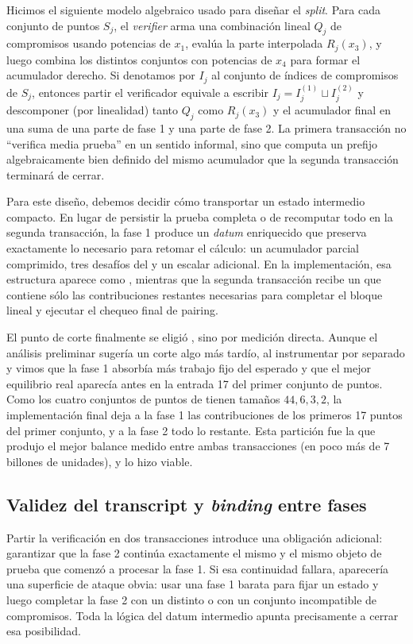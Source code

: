 Hicimos el siguiente modelo algebraico usado para diseñar el \textit{split}. Para cada conjunto de puntos $S_j$, el \textit{verifier} arma una combinación lineal $Q_j$ de compromisos usando potencias de $x_1$, evalúa la parte interpolada $R_j(x_3)$, y luego combina los distintos conjuntos con potencias de $x_4$ para formar el acumulador derecho. Si denotamos por $I_j$ al conjunto de índices de compromisos de $S_j$, entonces partir el verificador equivale a escribir $I_j = I_j^{(1)} \sqcup I_j^{(2)}$ y descomponer (por linealidad) tanto $Q_j$ como $R_j(x_3)$ y el acumulador final en una suma de una parte de fase 1 y una parte de fase 2. La primera transacción no ``verifica media prueba'' en un sentido informal, sino que computa un prefijo algebraicamente bien definido del mismo acumulador que la segunda transacción terminará de cerrar.

Para este diseño, debemos decidir cómo transportar un estado intermedio compacto. En lugar de persistir la prueba completa o de recomputar todo en la segunda transacción, la fase 1 produce un \textit{datum} enriquecido que preserva exactamente lo necesario para retomar el cálculo: un acumulador parcial comprimido, tres desafíos del \transcript y un escalar adicional. En la implementación, esa estructura aparece como \PhaseOneState, mientras que la segunda transacción recibe un \ReducedRedeemer que contiene sólo las contribuciones restantes necesarias para completar el bloque lineal y ejecutar el chequeo final de pairing.

El punto de corte finalmente se eligió , sino por medición directa. Aunque el análisis preliminar sugería un corte algo más tardío, al instrumentar por separado \PhaseOneSetupTx y \PhaseTwoVerifyTx vimos que la fase 1 absorbía más trabajo fijo del esperado y que el mejor equilibrio real aparecía antes en la entrada 17 del primer conjunto de puntos. Como los cuatro conjuntos de puntos de \MidnightSTMCircuit tienen tamaños $44, 6, 3, 2$, la implementación final deja a la fase 1 las contribuciones de los primeros 17 puntos del primer conjunto, y a la fase 2 todo lo restante. Esta partición fue la que produjo el mejor balance medido entre ambas transacciones (en poco más de 7 billones de unidades), y lo hizo viable.

\subsection{Validez del transcript y \textit{binding} entre fases}
Partir la verificación en dos transacciones introduce una obligación adicional: garantizar que la fase 2 continúa exactamente el mismo \transcript y el mismo objeto de prueba que comenzó a procesar la fase 1. Si esa continuidad fallara, aparecería una superficie de ataque obvia: usar una fase 1 barata para fijar un estado y luego completar la fase 2 con un \redeemer distinto o con un conjunto incompatible de compromisos. Toda la lógica del datum intermedio apunta precisamente a cerrar esa posibilidad.

